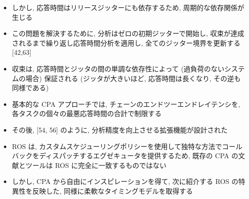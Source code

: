 {    \begin{frame}{}
        \begin{itemize}
            \item しかし, 応答時間はリリースジッターにも依存するため, 周期的な依存関係が生じる
            \item この問題を解決するために, 分析はゼロの初期ジッターで開始し, 収束が達成されるまで繰り返し応答時間分析を適用し, 全てのジッター境界を更新する [42,63]
            \item 収束は, 応答時間とジッタの間の単調な依存性によって (過負荷のないシステムの場合) 保証される (ジッタが大きいほど, 応答時間は長くなり, その逆も同様である)
            \item 基本的な CPA アプローチでは, チェーンのエンドツーエンドレイテンシを, 各タスクの個々の最悪応答時間の合計で制限する
            \item その後, [54, 56] のように, 分析精度を向上させる拡張機能が設計された
        \end{itemize}
    \end{frame}

    \begin{frame}{}
        \begin{itemize}
            \item ROS は, カスタムスケジューリングポリシーを使用して独特な方法でコールバックをディスパッチするエグゼキュータを提供するため, 既存の CPA の文献とツールは ROS に完全に一致するものではない
            \item しかし, CPA から自由にインスピレーションを得て, 次に紹介する ROS の特異性を反映した, 同様に柔軟なタイミングモデルを取得する
        \end{itemize}
    \end{frame}
}
